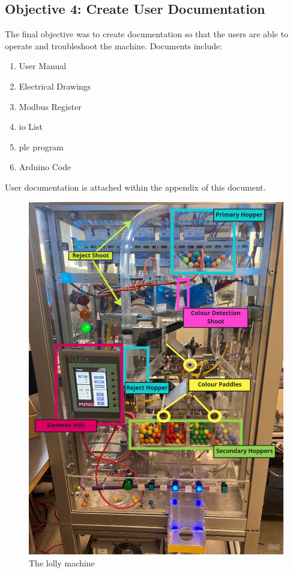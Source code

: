     \subsection{Objective 4: Create User Documentation}
        The final objective was to create documentation so that the users are able to operate and troubleshoot the machine. Documents include:

        \begin{enumerate}
            \item   User Manual
            \item   Electrical Drawings
            \item   Modbus Register
            \item   \acrshort{io} List
            \item   \acrshort{plc} program
            \item   Arduino Code
        \end{enumerate}
        
        User documentation is attached within the appendix of this document. 



    \begin{figure}[ht]
        \centering
        \includegraphics[scale = 0.5]{2_images/lollyMachine}
        \caption{The lolly machine}
        \label{fig:lollyMachine}
    \end{figure}
